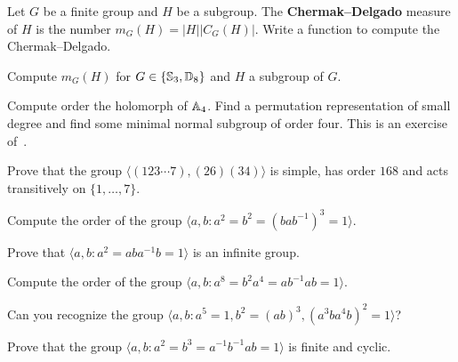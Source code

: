 
\begin{prob}
	\label{prob:ChermakDelgado}
	Let $G$ be a finite group and $H$ be a subgroup. The \textbf{Chermak--Delgado} measure of $H$ 
	is the number $m_G(H)=|H||C_G(H)|$. 
	Write a function to compute the Chermak--Delgado.
\end{prob}

\begin{prob}
	\label{prob:ChermakDelgadoS3D8}
	Compute $m_G(H)$ for $G\in\{\mathbb{S}_3,\mathbb{D}_8\}$ and $H$ a subgroup of $G$. 
\end{prob}

\begin{prob}
	\label{prob:holA4}
	Compute order the holomorph of $\mathbb{A}_4$. Find a permutation representation
	of small degree and find some minimal normal subgroup of order four. This
	is an exercise of~\cite{MR2478410}.
\end{prob}

\begin{prob}
Prove that the group $\langle (123\cdots7),(26)(34)\rangle$ is simple, 
has order $168$ and acts transitively on $\{1,\dots,7\}$. 
\end{prob}

\begin{prob}
  Compute the order of the group $\langle a,b:a^2=b^2=(bab^{-1})^3=1\rangle$. 
\end{prob}

\begin{prob}
  Prove that $\langle a,b:a^2=aba^{-1}b=1\rangle$ is an infinite group.
\end{prob}

\begin{prob}
	\label{prob:order16}
  Compute the order of the group
  $\langle a,b: a^8=b^2a^4=ab^{-1}ab=1\rangle$.
\end{prob}

\begin{prob}
\label{prob:recognizeA5}
Can you recognize the group $\langle a,b:a^5=1, b^2=(ab)^3, (a^3ba^4b)^2=1\rangle$?
\end{prob}
%
\begin{prob}
Prove that the group $\langle a,b:a^2=b^3=a^{-1}b^{-1}ab=1\rangle$ is finite and cyclic.
\end{prob}

